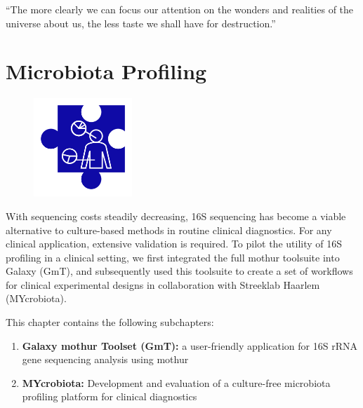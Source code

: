\begin{savequote}[75mm]
“The more clearly we can focus our attention on the wonders and realities of the universe about us, the less taste we shall have for destruction.”
\end{savequote}

\chapter{Microbiota Profiling}\label{chapter:microbiota}
\setcounter{figure}{-1}
\setcounter{table}{-1}
\setcounter{section}{-1}

\begin{figure}[t!]
\includegraphics[height=10em]{frontmatter/images/chapter-header-5.png}
\end{figure}
\setcounter{figure}{-1}
\setcounter{table}{-1}
\setcounter{section}{-1}

With sequencing costs steadily decreasing, 16S sequencing has become a viable alternative to culture-based methods in routine clinical diagnostics. For any clinical application, extensive validation is required. To pilot the utility of 16S profiling in a clinical setting, we first integrated the full mothur toolsuite into Galaxy (GmT), and subsequently used this toolsuite to create a set of workflows for clinical experimental designs in collaboration with Streeklab Haarlem (MYcrobiota).

This chapter contains the following subchapters:

\begin{enumerate}
\itemsep-0.5em
\item \textbf{Galaxy mothur Toolset (GmT):} a user-friendly application for 16S rRNA gene sequencing analysis using mothur
\item \textbf{MYcrobiota:} Development and evaluation of a culture-free microbiota profiling platform for clinical diagnostics
\end{enumerate}



